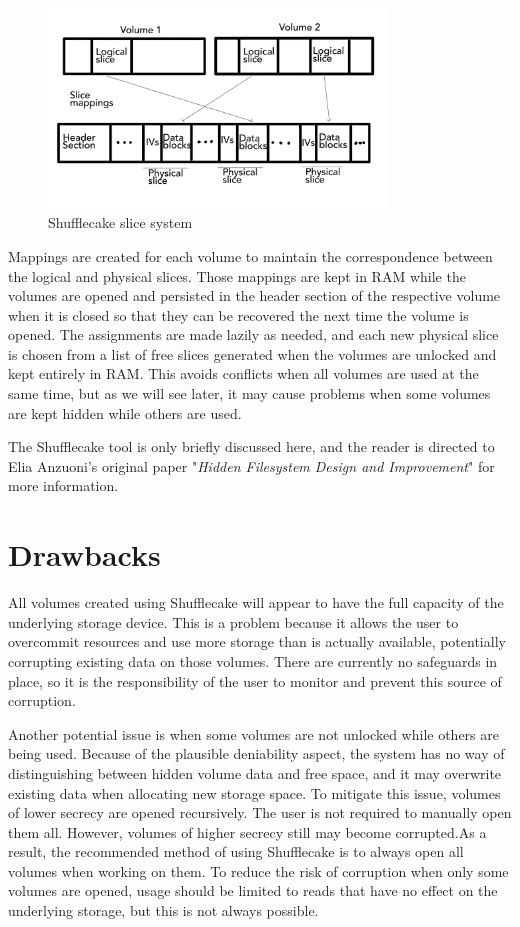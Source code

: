 \documentclass[a4paper,11pt,oneside]{report}
\begin{document}
\begin{figure}[ht]
\centering
\includegraphics[width=0.8\textwidth]{Figures/sflc_slices.png}
\caption{Shufflecake slice system}
\label{fig:sflc_slices}
\end{figure}

Mappings are created for each volume to maintain the correspondence between the logical and physical slices. Those mappings are kept in RAM while the volumes are opened and persisted in the header section of the respective volume when it is closed so that they can be recovered the next time the volume is opened. The assignments are made lazily as needed, and each new physical slice is chosen from a list of free slices generated when the volumes are unlocked and kept entirely in RAM. This avoids conflicts when all volumes are used at the same time, but as we will see later, it may cause problems when some volumes are kept hidden while others are used.

The Shufflecake tool is only briefly discussed here, and the reader is directed to Elia Anzuoni's original paper "\textit{Hidden Filesystem Design and Improvement}"\cite{Anzuoni:297353} for more information.

\section{Drawbacks}

All volumes created using Shufflecake will appear to have the full capacity of the underlying storage device. This is a problem because it allows the user to overcommit resources and use more storage than is actually available, potentially corrupting existing data on those volumes. There are currently no safeguards in place, so it is the responsibility of the user to monitor and prevent this source of corruption.

Another potential issue is when some volumes are not unlocked while others are being used. Because of the plausible deniability aspect, the system has no way of distinguishing between hidden volume data and free space, and it may overwrite existing data when allocating new storage space. To mitigate this issue, volumes of lower secrecy are opened recursively. The user is not required to manually open them all. However, volumes of higher secrecy still may become corrupted.As a result, the recommended method of using Shufflecake is to always open all volumes when working on them. To reduce the risk of corruption when only some volumes are opened, usage should be limited to reads that have no effect on the underlying storage, but this is not always possible.
\end{document}
